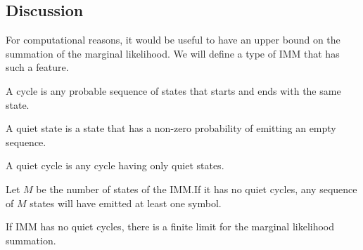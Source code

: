 \subsection{Discussion}

For computational reasons, it would be useful to have an upper bound on the summation of the
marginal likelihood.
We will define a type of IMM that has such a feature.

\begin{definition}
  A cycle is any probable sequence of states that starts and ends with the same state.
\end{definition}

\begin{definition}
  A quiet state is a state that has a non-zero probability of emitting an empty sequence.
\end{definition}

\begin{definition}
  A quiet cycle is any cycle having only quiet states.
\end{definition}

\begin{corollary}
  Let $M$ be the number of states of the IMM.\@ If it has no quiet cycles, any sequence of $M$ states
  will have emitted at least one symbol.
\end{corollary}

If IMM has no quiet cycles, there is a finite limit for the marginal likelihood summation.
